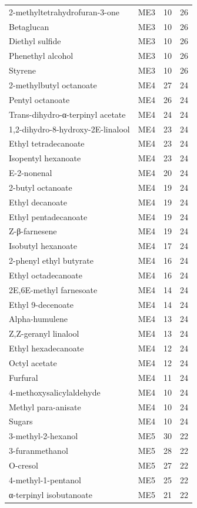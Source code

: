 {\begin{longtable}{lrrr}
2-methyltetrahydrofuran-3-one & ME3 & 10 & 26 \\
Betaglucan & ME3 & 10 & 26 \\
Diethyl sulfide & ME3 & 10 & 26 \\
Phenethyl alcohol & ME3 & 10 & 26 \\
Styrene & ME3 & 10 & 26 \\
2-methylbutyl octanoate & ME4 & 27 & 24 \\
Pentyl octanoate & ME4 & 26 & 24 \\
Trans-dihydro-α-terpinyl acetate & ME4 & 24 & 24 \\
1,2-dihydro-8-hydroxy-2E-linalool & ME4 & 23 & 24 \\
Ethyl tetradecanoate & ME4 & 23 & 24 \\
Isopentyl hexanoate & ME4 & 23 & 24 \\
E-2-nonenal & ME4 & 20 & 24 \\
2-butyl octanoate & ME4 & 19 & 24 \\
Ethyl decanoate & ME4 & 19 & 24 \\
Ethyl pentadecanoate & ME4 & 19 & 24 \\
Z-β-farnesene & ME4 & 19 & 24 \\
Isobutyl hexanoate & ME4 & 17 & 24 \\
2-phenyl ethyl butyrate & ME4 & 16 & 24 \\
Ethyl octadecanoate & ME4 & 16 & 24 \\
2E,6E-methyl farnesoate & ME4 & 14 & 24 \\
Ethyl 9-decenoate & ME4 & 14 & 24 \\
Alpha-humulene & ME4 & 13 & 24 \\
Z,Z-geranyl linalool & ME4 & 13 & 24 \\
Ethyl hexadecanoate & ME4 & 12 & 24 \\
Octyl acetate & ME4 & 12 & 24 \\
Furfural & ME4 & 11 & 24 \\
4-methoxysalicylaldehyde & ME4 & 10 & 24 \\
Methyl para-anisate & ME4 & 10 & 24 \\
Sugars & ME4 & 10 & 24 \\
3-methyl-2-hexanol & ME5 & 30 & 22 \\
3-furanmethanol & ME5 & 28 & 22 \\
O-cresol & ME5 & 27 & 22 \\
4-methyl-1-pentanol & ME5 & 25 & 22 \\
α-terpinyl isobutanoate & ME5 & 21 & 22 \\

\end{longtable}}
